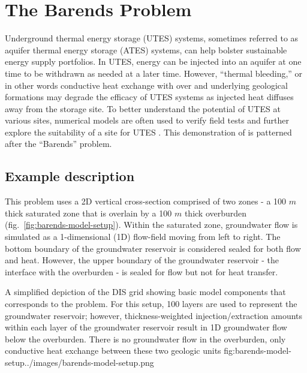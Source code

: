 \section{The Barends Problem}

Underground thermal energy storage (UTES) systems, sometimes referred to as aquifer thermal energy storage (ATES) systems, can help bolster sustainable energy supply portfolios. In UTES, energy can be injected into an aquifer at one time to be withdrawn as needed at a later time.  However, ``thermal bleeding,'' or in other words conductive heat exchange with over and underlying geological formations may degrade the efficacy of UTES systems as injected heat diffuses away from the storage site.  To better understand the potential of UTES at various sites, numerical models are often used to verify field tests and further explore the suitability of a site for UTES \citep{barends2010}.  This demonstration of \mf is patterned after the ``Barends'' problem.  

\subsection{Example description}

This problem uses a 2D vertical cross-section comprised of two zones - a 100 $m$ thick saturated zone that is overlain by a 100 $m$ thick overburden (fig.~\ref{fig:barends-model-setup}). Within the saturated zone, groundwater flow is simulated as a 1-dimensional (1D) flow-field moving from left to right.  The bottom boundary of the groundwater reservoir is considered sealed for both flow and heat.  However, the upper boundary of the groundwater reservoir - the interface with the overburden - is sealed for flow but not for heat transfer.  

\begin{StandardFigure}{
    A simplified depiction of the DIS grid \citep{modflow6gwf} showing basic model components that corresponds to the \cite{barends2010} problem. For this setup, 100 layers are used to represent the groundwater reservoir; however, thickness-weighted injection/extraction amounts within each layer of the groundwater reservoir result in 1D groundwater flow below the overburden. There is no groundwater flow in the overburden, only conductive heat exchange between these two geologic units}
    {fig:barends-model-setup}{../images/barends-model-setup.png}
\end{StandardFigure}

